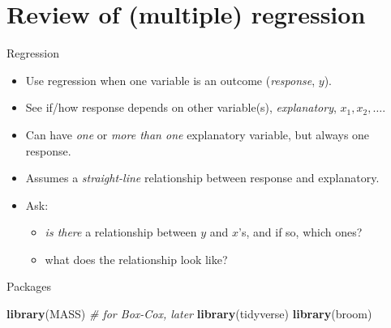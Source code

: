 \documentclass[ignorenonframetext,]{beamer}
\newenvironment{Shaded}{\begin{snugshade}}{\end{snugshade}}
\newcommand{\CommentTok}[1]{\textcolor[rgb]{0.56,0.35,0.01}{\textit{#1}}}
\newcommand{\KeywordTok}[1]{\textcolor[rgb]{0.13,0.29,0.53}{\textbf{#1}}}
\newcommand{\NormalTok}[1]{#1}
\providecommand{\tightlist}{%
  \setlength{\itemsep}{0pt}\setlength{\parskip}{0pt}}
\begin{document}
\hypertarget{review-of-multiple-regression}{%
\section{Review of (multiple)
regression}\label{review-of-multiple-regression}}

\begin{frame}{Regression}
\protect\hypertarget{regression}{}

\begin{itemize}
\item
  Use regression when one variable is an outcome (\emph{response},
  \(y\)).
\item
  See if/how response depends on other variable(s), \emph{explanatory},
  \(x_1, x_2,\ldots\).
\item
  Can have \emph{one} or \emph{more than one} explanatory variable, but
  always one response.
\item
  Assumes a \emph{straight-line} relationship between response and
  explanatory.
\item
  Ask:

  \begin{itemize}
  \tightlist
  \item
    \emph{is there} a relationship between \(y\) and \(x\)'s, and if so,
    which ones?
  \item
    what does the relationship look like?
  \end{itemize}
\end{itemize}

\end{frame}

\begin{frame}[fragile]{Packages}
\protect\hypertarget{packages}{}

\begin{Shaded}
\begin{Highlighting}[]
\KeywordTok{library}\NormalTok{(MASS) }\CommentTok{# for Box-Cox, later}
\KeywordTok{library}\NormalTok{(tidyverse)}
\KeywordTok{library}\NormalTok{(broom)}
\end{Highlighting}
\end{Shaded}

\end{frame}
\end{document}
